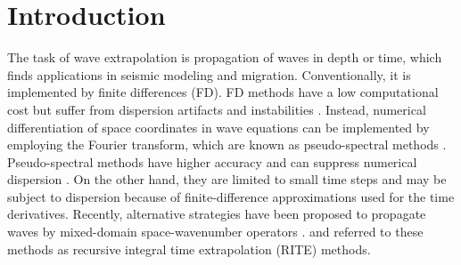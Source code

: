 \section{Introduction}
The task of wave extrapolation is propagation of waves in depth or time, which finds applications in seismic modeling and migration. 
Conventionally, it is implemented by finite differences (FD). FD methods have a low computational cost but suffer from dispersion artifacts and instabilities \cite[]{kosloff}. Instead, numerical differentiation of space coordinates in wave equations can be implemented by employing the Fourier transform, which are known as pseudo-spectral methods . Pseudo-spectral methods have higher accuracy and can suppress numerical dispersion \cite[]{reshef,review}. On the other hand, they are limited to small time steps and may be subject to dispersion because of finite-difference approximations used for the time derivatives. Recently, alternative strategies have been proposed to propagate waves by mixed-domain space-wavenumber operators \cite[]{soubaras,wards,etgen09abs,liu,zhang09,du,pestana,chu11,lowrank,wu14a}. \cite{fowler} and \cite{rite} referred to these methods as recursive integral time extrapolation (RITE) methods.

